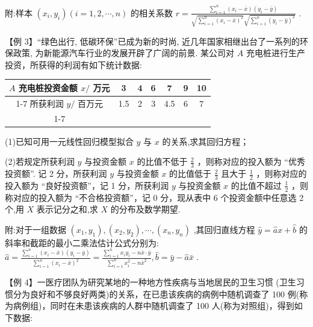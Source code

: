 附:样本 $\left( {{x}_{i},{y}_{i}}\right) \left( {i = 1,2,\cdots ,n}\right)$ 的相关系数 $r = \frac{\mathop{\sum }\limits_{{i = 1}}^{n}\left( {{x}_{i} - \bar{x}}\right) \left( {{y}_{i} - \bar{y}}\right) }{\sqrt{\mathop{\sum }\limits_{{i = 1}}^{n}{\left( {x}_{i} - \bar{x}\right) }^{2}}\sqrt{\mathop{\sum }\limits_{{i = 1}}^{n}{\left( {y}_{i} - \bar{y}\right) }^{2}}}$ .

【例 3】“绿色出行, 低碳环保”已成为新的时尚, 近几年国家相继出台了一系列的环保政策, 为新能源汽车行业的发展开辟了广阔的前景. 某公司对 $A$ 充电桩进行生产投资，所获得的利润有如下统计数据:

\begin{center}
\begin{tabular}{|c|c|c|c|c|c|c|}
\hline
$A$ 充电桩投资金额 $x/$ 万元 & 3 & 4 & 6 & 7 & 9 & 10 \\
\cline{1-7}
所获利润 $y/$ 百万元 & 1.5 & 2 & 3 & 4.5 & 6 & 7 \\
\cline{1-7}
\hline
\end{tabular}
\end{center}

(1)已知可用一元线性回归模型拟合 $y$ 与 $x$ 的关系,求其回归方程；

(2)若规定所获利润 $y$ 与投资金额 $x$ 的比值不低于 $\frac{2}{3}$ ，则称对应的投入额为 “优秀投资额”. 记 2 分，所获利润 $y$ 与投资金额 $x$ 的比值低于 $\frac{2}{3}$ 且大于 $\frac{1}{2}$ ，则称对应的投入额为 “良好投资额”，记 1 分，所获利润 $y$ 与投资金额 $x$ 的比值不超过 $\frac{1}{2}$ ，则称对应的投入额为 “不合格投资额”，记 0 分，现从表中 6 个投资金额中任意选 2 个,用 $X$ 表示记分之和,求 $X$ 的分布及数学期望.

附:对于一组数据 $\left( {{x}_{1},{y}_{1}}\right) ,\left( {{x}_{2},{y}_{2}}\right) ,\cdots ,\left( {{x}_{n},{y}_{n}}\right)$ ,其回归直线方程 $\widehat{y} = \widehat{a}x + \widehat{b}$ 的斜率和截距的最小二乘法估计公式分别为: $\widehat{a} = \frac{\mathop{\sum }\limits_{{i = 1}}^{n}\left( {{x}_{i} - \bar{x}}\right) \left( {{y}_{i} - \bar{y}}\right) }{\mathop{\sum }\limits_{{i = 1}}^{n}{\left( {x}_{i} - \bar{x}\right) }^{2}} = \frac{\mathop{\sum }\limits_{{i = 1}}^{n}{x}_{i}{y}_{i} - n\bar{x} \cdot  \bar{y}}{\mathop{\sum }\limits_{{i = 1}}^{n}{x}_{i}^{2} - n{\bar{x}}^{2}},\widehat{b} = \bar{y} - \widehat{a}\bar{x}$ .

【例 4】一医疗团队为研究某地的一种地方性疾病与当地居民的卫生习惯 (卫生习惯分为良好和不够良好两类)的关系，在已患该疾病的病例中随机调查了 100 例(称为病例组)，同时在未患该疾病的人群中随机调查了 100 人(称为对照组)，得到如下数据:

